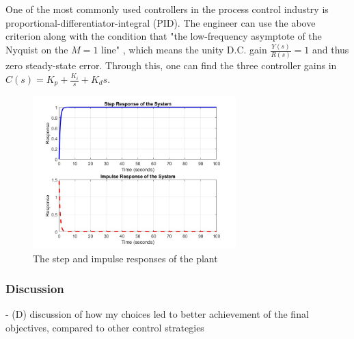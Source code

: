 One of the most commonly used controllers in the process control industry is proportional-differentiator-integral (PID). The engineer can use the above criterion along with the condition that "the low-frequency asymptote of the Nyquist on the $M=1$ line" \cite{E-Cannon2022-2}, which means the unity D.C. gain $\frac{Y(s)}{R(s)} = 1$ and thus zero steady-state error. Through this, one can find the three controller gains in $C(s) = K_p + \frac{K_i}{s} + K_d s$.

\begin{figure}[h]
    \centering
    \includegraphics[width=0.7\textwidth]{eunsoo/E-1-4-step-and-impulse.jpg}
    \hfill
    \caption{The step and impulse responses of the plant}
    \label{figure:E-1-4-step-and-impulse}
\end{figure}

\vspace{-10mm}
\subsubsection{Discussion}
- (D) discussion of how my choices led to better achievement of the final objectives, compared to other control strategies

% 
% 
